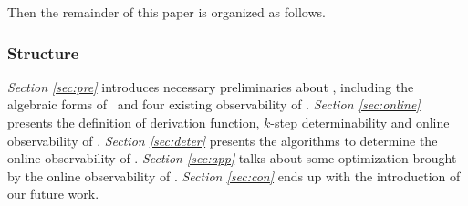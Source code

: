 Then the remainder of this paper is organized as follows.
\subsubsection*{Structure}
 {\em Section \ref{sec:pre}} introduces necessary preliminaries about \BCNs, including the algebraic forms of \BCNs\ and four existing observability of \BCNs. {\em Section \ref{sec:online}} presents the definition of derivation function, $k$-step determinability and online observability of \BCNs. {\em Section \ref{sec:deter}} presents the algorithms to determine the online observability of \BCNs. {\em Section \ref{sec:app}} talks about some optimization brought by the online observability of \BCNs. {\em Section \ref{sec:con}} ends up with the introduction of our future work.


